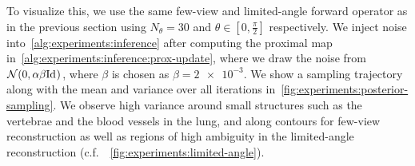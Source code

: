 \documentclass[../ml-ct.tex]{subfiles}
\begin{document}
To visualize this, we use the same few-view and limited-angle forward operator as in the previous section using \( N_\theta = \num{30} \) and \( \theta \in [0, \frac{\pi}{2}] \) respectively.
We inject noise into~\cref{alg:experiments:inference} after computing the proximal map in~\cref{alg:experiments:inference:prox-update}, where we draw the noise from \( \mathcal{N}(0, \alpha\beta \mathrm{Id}_{}) \), where \( \beta \) is chosen as \( \beta = \num{2e-3} \).
We show a sampling trajectory along with the mean and variance over all iterations in~\cref{fig:experiments:posterior-sampling}.
We observe high variance around small structures such as the vertebrae and the blood vessels in the lung, and along contours for few-view reconstruction as well as regions of high ambiguity in the limited-angle reconstruction (c.f.~~\cref{fig:experiments:limited-angle}).
\begin{figure}
	\centering
\end{figure}
\end{document}
